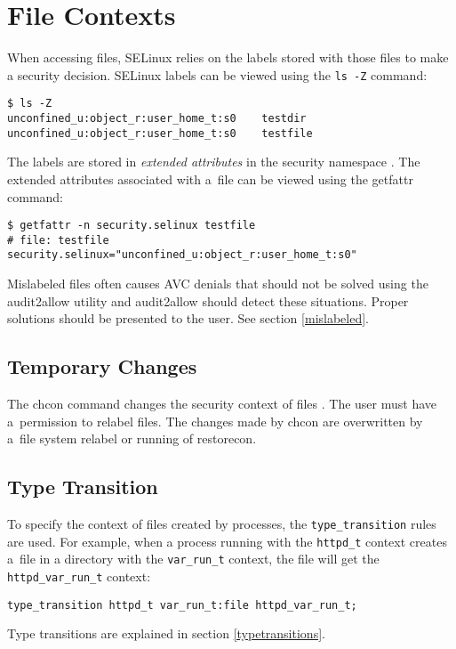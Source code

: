 \section{File Contexts}
\label{filecontexts}
When accessing files, SELinux relies on the labels stored with those files to
make a security decision. SELinux labels can be viewed using the \texttt{ls -Z}
command:
\begin{lstlisting}
$ ls -Z
unconfined_u:object_r:user_home_t:s0    testdir
unconfined_u:object_r:user_home_t:s0    testfile
\end{lstlisting}
The labels are stored in \emph{extended attributes} in the security namespace
\cite{xattrman}. The extended attributes associated with a~file can be viewed
using the getfattr command:
\begin{lstlisting}
$ getfattr -n security.selinux testfile
# file: testfile
security.selinux="unconfined_u:object_r:user_home_t:s0"
\end{lstlisting}
Mislabeled files often causes AVC denials that should not be solved using the
audit2allow utility and audit2allow should detect these situations. Proper
solutions should be presented to the user. See section \ref{mislabeled}.

\subsection{Temporary Changes}
The chcon command changes the security context of files \cite{selinuxguide}. The
user must have a~permission to relabel files. The changes made by chcon are
overwritten by a~file system relabel or running of restorecon.

\subsection{Type Transition}
To specify the context of files created by processes, the
\texttt{type\_transition} rules are used. For example, when a process running
with the \texttt{httpd\_t} context creates a~file in a directory with the
\texttt{var\_run\_t} context, the file will get the
\texttt{httpd\_var\_run\_t} context:
\begin{lstlisting}[language=te]
type_transition httpd_t var_run_t:file httpd_var_run_t;
\end{lstlisting}
Type transitions are explained in section \ref{typetransitions}.

